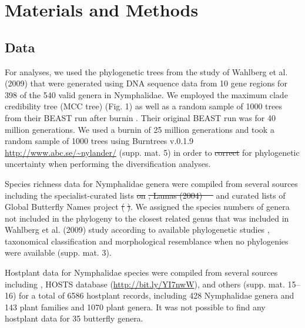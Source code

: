 \documentclass[10pt]{article}
\providecommand{\DIFaddtex}[1]{{\protect\color{blue}\uwave{#1}}} %
\providecommand{\DIFdeltex}[1]{{\protect\color{red}\sout{#1}}}                      %
\providecommand{\DIFaddbegin}{} %
\providecommand{\DIFaddend}{} %
\providecommand{\DIFdelbegin}{} %
\providecommand{\DIFdelend}{} %
\providecommand{\DIFadd}[1]{\texorpdfstring{\DIFaddtex{#1}}{#1}} %
\providecommand{\DIFdel}[1]{\texorpdfstring{\DIFdeltex{#1}}{}} %
\begin{document}
\section*{Materials and Methods}

\subsection*{Data}

For analyses, we used the phylogenetic trees from the study of Wahlberg
et al. (2009) \cite{wahlberg2009} that were generated using DNA sequence data from
10 gene regions for 398 of the 540 valid genera in Nymphalidae. We
employed the maximum clade credibility tree (MCC tree) (Fig. 1) as well
as a random sample of 1000 trees from their BEAST run after burnin
\cite{wahlberg2009}. Their original BEAST run was for 40 million generations. We
used a burnin of 25 million generations and took a random sample of 1000
trees using Burntrees v.0.1.9 \url{http://www.abc.se/~nylander/} (supp.
mat. 5) in order to \DIFdelbegin \DIFdel{correct }\DIFdelend \DIFaddbegin \DIFadd{account }\DIFaddend for phylogenetic uncertainty when performing
the diversification analyses.

Species richness data for Nymphalidae genera were compiled from several
sources including the specialist-curated lists 
\DIFdelbegin \DIFdel{on
}%
\DIFdel{, Lamas (2004) \mbox{%
\cite{lamas2004}
}%
}\DIFdelend \DIFaddbegin \DIFadd{\mbox{%
\cite{tolweb2007, lamas2004}
}%
}\DIFaddend and curated lists of \DIFaddbegin \DIFadd{the
}\DIFaddend Global Butterfly Names project \DIFdelbegin \DIFdel{(}%
\DIFdel{)}\DIFdelend \DIFaddbegin \DIFadd{\mbox{%
\cite{gbnp}
}%
}\DIFaddend .
We assigned the species numbers of genera not included in the phylogeny
to the closest related genus that was included in Wahlberg et al. (2009)
\cite{wahlberg2009} study according to available phylogenetic studies 
\cite{matos2013, brower2010, kodandaramaiah2010, kodandaramaiah2010a,
ortiz2013, desilva2010, freitas2004, pena2006, penz1999, silva2008,
pena2011, pena2010},
taxonomical classification and morphological resemblance when no
phylogenies were available (supp. mat. 3).

Hostplant data for Nymphalidae species were compiled from several
sources including \cite{ackery1988}, HOSTS database (\url{http://bit.ly/YI7nwW}),
\cite{dyer2002, beccaloni2008, janzen2009} and others (supp. mat. 15--16) for a total of 6586
hostplant records, including 428 Nymphalidae genera and 143 plant
families and 1070 plant genera. It was not possible to find any
hostplant data for 35 butterfly genera.
\end{document}
